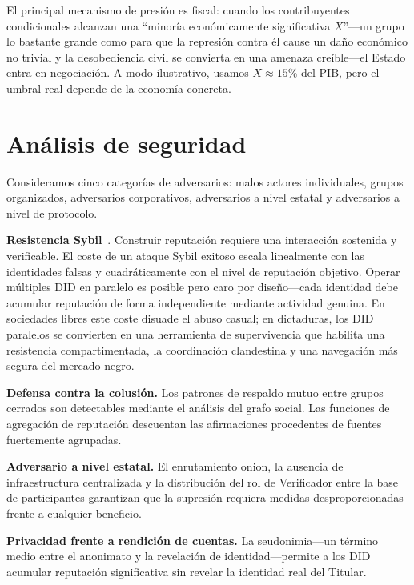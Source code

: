 \documentclass[11pt,a4paper,twocolumn]{article}
\begin{document}
El principal mecanismo de presión es fiscal: cuando los contribuyentes condicionales alcanzan una ``minoría económicamente significativa $X$''---un grupo lo bastante grande como para que la represión contra él cause un daño económico no trivial y la desobediencia civil se convierta en una amenaza creíble---el Estado entra en negociación. A modo ilustrativo, usamos $X \approx 15\%$ del PIB, pero el umbral real depende de la economía concreta.

\section{Análisis de seguridad}

Consideramos cinco categorías de adversarios: malos actores individuales, grupos organizados, adversarios corporativos, adversarios a nivel estatal y adversarios a nivel de protocolo.

\textbf{Resistencia Sybil}~\cite{douceur2002}. Construir reputación requiere una interacción sostenida y verificable. El coste de un ataque Sybil exitoso escala linealmente con las identidades falsas y cuadráticamente con el nivel de reputación objetivo. Operar múltiples DID en paralelo es posible pero caro por diseño---cada identidad debe acumular reputación de forma independiente mediante actividad genuina. En sociedades libres este coste disuade el abuso casual; en dictaduras, los DID paralelos se convierten en una herramienta de supervivencia que habilita una resistencia compartimentada, la coordinación clandestina y una navegación más segura del mercado negro.

\textbf{Defensa contra la colusión.} Los patrones de respaldo mutuo entre grupos cerrados son detectables mediante el análisis del grafo social. Las funciones de agregación de reputación descuentan las afirmaciones procedentes de fuentes fuertemente agrupadas.

\textbf{Adversario a nivel estatal.} El enrutamiento onion, la ausencia de infraestructura centralizada y la distribución del rol de Verificador entre la base de participantes garantizan que la supresión requiera medidas desproporcionadas frente a cualquier beneficio.

\textbf{Privacidad frente a rendición de cuentas.} La seudonimia---un término medio entre el anonimato y la revelación de identidad---permite a los DID acumular reputación significativa sin revelar la identidad real del Titular.
\end{document}
